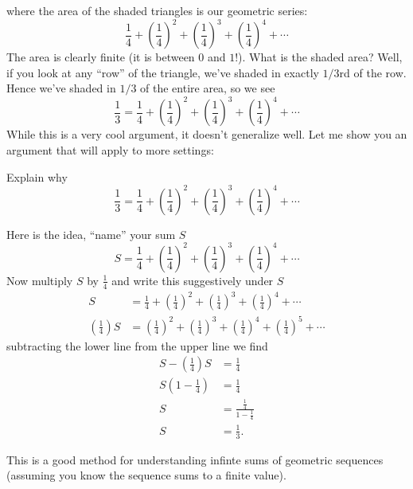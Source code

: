 \documentclass{ximera}
\begin{document}
where the area of the shaded triangles is our geometric series:
\[
\frac{1}{4} + \left(\frac{1}{4}\right)^2 + \left(\frac{1}{4}\right)^3 + \left(\frac{1}{4}\right)^4 + \cdots 
\]
The area is clearly finite (it is between $0$ and $1$!). What is the
shaded area? Well, if you look at any ``row'' of the triangle, we've
shaded in exactly $1/3$rd of the row. Hence we've shaded in $1/3$ of
the entire area, so we see
\[
\frac{1}{3}=\frac{1}{4} + \left(\frac{1}{4}\right)^2 + \left(\frac{1}{4}\right)^3 + \left(\frac{1}{4}\right)^4 + \cdots 
\]
While this is a very cool argument, it doesn't generalize well. Let me
show you an argument that will apply to more settings:

\begin{example}
  Explain why
  \[
  \frac{1}{3}=\frac{1}{4} + \left(\frac{1}{4}\right)^2 + \left(\frac{1}{4}\right)^3 + \left(\frac{1}{4}\right)^4 + \cdots 
  \]
  \begin{explanation}
    Here is the idea, ``name'' your sum $S$
    \[
    S = \frac{1}{4} + \left(\frac{1}{4}\right)^2 + \left(\frac{1}{4}\right)^3 + \left(\frac{1}{4}\right)^4 + \cdots 
    \]
    Now multiply $S$ by $\frac{1}{4}$ and write this suggestively under $S$
    \begin{align*}
      S &= \frac{1}{4} + \left(\frac{1}{4}\right)^2 + \left(\frac{1}{4}\right)^3 + \left(\frac{1}{4}\right)^4 + \cdots\\
     \left(\frac{1}{4}\right)S &=   \left(\frac{1}{4}\right)^2 + \left(\frac{1}{4}\right)^3 + \left(\frac{1}{4}\right)^4 + \left(\frac{1}{4}\right)^5+ \cdots
    \end{align*}
    subtracting the lower line from the upper line we find
    \begin{align*}
      S - \left(\frac{1}{4}\right)S &=  \frac{1}{4}\\
      S(1-\frac{1}{4}) &= \frac{1}{4}\\
      S &= \frac{\frac{1}{4}}{1-\frac{1}{4}}\\
      S &= \frac{1}{3}.
    \end{align*}
  \end{explanation}
\end{example}

This is a good method for understanding infinte sums of geometric
sequences (assuming you know the sequence sums to a finite value).
\end{document}
